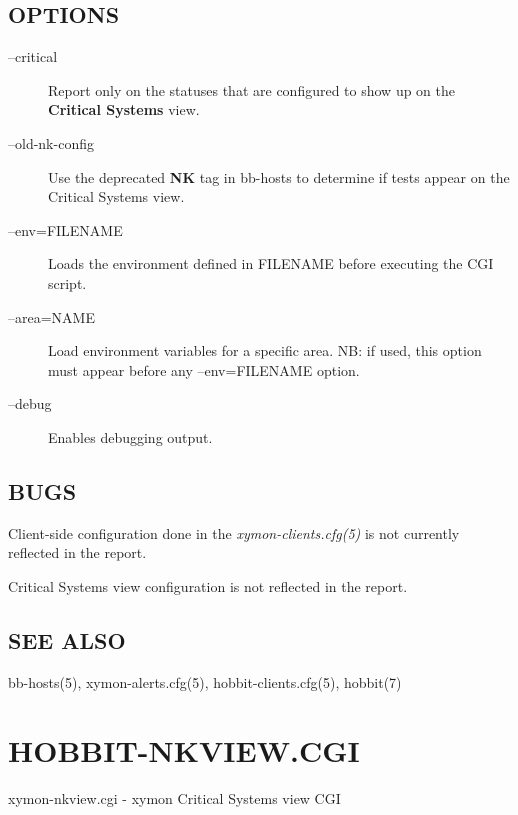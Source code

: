 \subsection{OPTIONS}
\begin{description}
\item[--critical] Report only on the statuses that are configured to
  show up on the \textbf{Critical Systems} view. 

 

\item[--old-nk-config] Use the deprecated \textbf{NK}
 tag in bb-hosts to determine if tests appear on the Critical Systems view. 

 

\item[--env=FILENAME] Loads the environment defined in FILENAME before
  executing the CGI script. 


 

\item[--area=NAME] Load environment variables for a specific area. NB:
  if used, this option must appear before any --env=FILENAME option. 


\item[--debug] Enables debugging output. 

 

\end{description}
\subsection{BUGS}
 Client-side configuration done in the \emph{xymon-clients.cfg(5)}
 is not currently reflected in the report. 

  Critical Systems view configuration is not reflected in the report. 


 
\subsection{SEE ALSO}
bb-hosts(5), xymon-alerts.cfg(5), hobbit-clients.cfg(5), hobbit(7) 


%
\newpage
\section{HOBBIT-NKVIEW.CGI}


 xymon-nkview.cgi - xymon Critical Systems view CGI 

